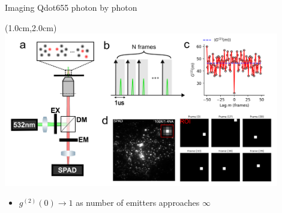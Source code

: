 \documentclass{beamer}					%
\begin{document}
\begin{frame}{Imaging Qdot655 photon by photon}
\begin{textblock*}{12cm}(1.0cm,2.0cm)
\includegraphics[width=12cm]{../../spad/spad/media/Figure-0.png}
\end{textblock*}
\begin{itemize}
\item $g^{(2)}(0) \rightarrow 1$ as number of emitters approaches $\infty$
\end{itemize}
\end{frame}
\end{document}
